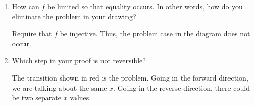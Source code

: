 \documentclass[letterpaper,12pt,fleqn]{article}
\begin{document}
\begin{enumerate}[left=0in]
  \bigskip

\item How can \(f\) be limited so that equality occurs.  In other words, how do you eliminate the problem in
  your drawing?

  \bigskip

  Require that \(f\) be injective.  Thus, the problem case in the diagram does not occur.

  \bigskip
  
\item Which step in your proof is not reversible?

  \bigskip

  The transition shown in red is the problem.  Going in the forward direction, we are talking about the same \(x\).
  Going in the reverse direction, there could be two separate \(x\) values.
\end{enumerate}
\end{document}
